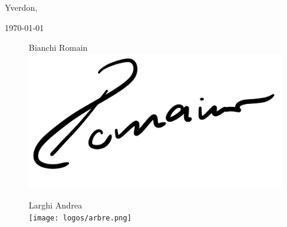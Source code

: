 \documentclass{rapport}
\begin{document}







\fairepagedegarde %
\thispagestyle{noPage}
\tabledematieres %
\thispagestyle{noPage}
\newpage
\listoffigures
\listoftables
\clearpage
\setcounter{page}{1}
\fairemarges %






%

%



\begin{flushright}
    Yverdon, {\today\par}
\end{flushright}

\begin{figure}[H]
    \centering
    \begin{minipage}[b]{0.3\textwidth}
      \centering
      Bianchi Romain\\
      \includegraphics[height=0.4\textwidth]{Images/Bianchi.jpg}
    \end{minipage}
    \hfill
    \begin{minipage}[b]{0.3\textwidth}
      \centering
      Larghi Andrea\\
      \texttt{[image: logos/arbre.png]}
    \end{minipage}
  \end{figure}

\newpage
\printbibliography %

\newpage
\appendix

% 
% 
\end{document}
